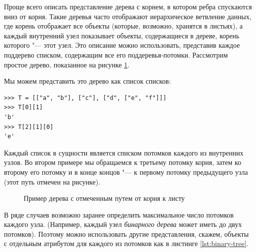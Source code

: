 Проще всего описать представление дерева с корнем, в котором ребра спускаются вниз от корня. Такие деревья часто отображают иерархическое ветвление данных, где корень отображает все объекты (которые, возможно, хранятся в листьях), а каждый внутренний узел показывает объекты, содержащиеся в дереве, корень которого "--- этот узел. Это описание можно использовать, представив каждое поддерево списком, содержащим все его поддеревья-потомки. Рассмотрим простое дерево, показанное на рисунке \ref{fig:simple-tree}.

Мы можем представить это дерево как список списков:
\begin{lstlisting}
>>> T = [["a", "b"], ["c"], ["d", ["e", "f"]]]
>>> T[0][1]
'b'
>>> T[2][1][0]
'e'
\end{lstlisting}

Каждый список в сущности является списком потомков каждого из внутренних узлов. Во втором примере мы обращаемся к третьему потомку корня, затем ко второму его потомку и в конце концов "--- к первому потомку предыдущего узла (этот путь отмечен на рисунке).


\begin{figure}[h]
\centering
{}
\caption{Пример дерева с отмеченным путем от корня к листу}
\label{fig:simple-tree}
\end{figure}


В ряде случаев возможно заранее определить максимальное число потомков каждого узла. (Например, каждый узел \textit{бинарного дерева} может иметь до двух потомков). Поэтому можно использовать другие представления, скажем, объекты с отдельным атрибутом для каждого из потомков как в листинге \ref{lst:binary-tree}.

